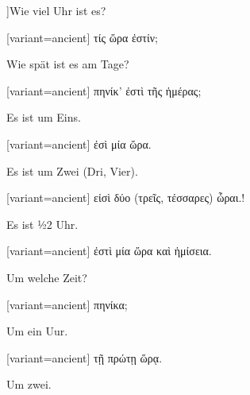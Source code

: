 ]\indent Wie viel Uhr ist es?

\switchcolumn

\begin{greek}[variant=ancient]%
τίς ὥρα ἐστίν;

\end{greek}%
\switchcolumn*

Wie spät ist es am Tage?

\switchcolumn

\begin{greek}[variant=ancient]%
πηνίκ' ἐστὶ τῆς ἡμέρας;

\end{greek}%
\switchcolumn*

Es ist um Eins.

\switchcolumn

\begin{greek}[variant=ancient]%
ἐσὶ μία ὥρα.

\end{greek}%
\switchcolumn*

Es ist um Zwei (Dri, Vier).

\switchcolumn

\begin{greek}[variant=ancient]%
εἰσὶ δύο (τρεῖς, τέσσαρες) ὦραι.!

\end{greek}%
\switchcolumn*

Es ist ½2 Uhr.

\switchcolumn

\begin{greek}[variant=ancient]%
ἐστὶ μία ὥρα καὶ ἡμίσεια.

\end{greek}%
\switchcolumn*

Um welche Zeit?

\switchcolumn

\begin{greek}[variant=ancient]%
πηνίκα;

\end{greek}%
\switchcolumn*

Um ein Uur.

\switchcolumn

\begin{greek}[variant=ancient]%
τῇ πρώτῃ ὥρᾳ.

\end{greek}%
\switchcolumn*

Um zwei.

\switchcolumn

